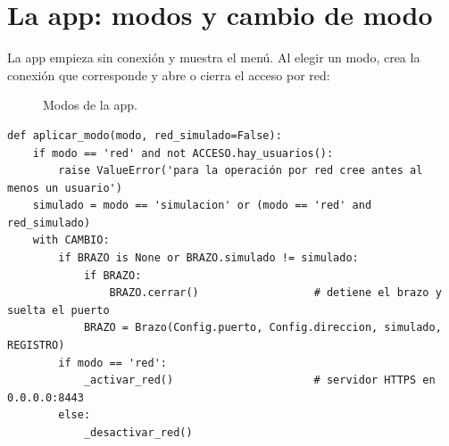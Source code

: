 \documentclass[a4paper,11pt]{article}
\begin{document}
\section{La app: modos y cambio de modo}
La app empieza sin conexión y muestra el menú. Al elegir un modo,  crea la conexión que corresponde y abre o cierra el acceso por red:

\begin{figure}[H]
\centering
{}
\caption{Modos de la app.}
\end{figure}

\begin{lstlisting}[style=py, caption={Cambio de modo (\texttt{gemelo\_brazo.py}).}]
def aplicar_modo(modo, red_simulado=False):
    if modo == 'red' and not ACCESO.hay_usuarios():
        raise ValueError('para la operación por red cree antes al menos un usuario')
    simulado = modo == 'simulacion' or (modo == 'red' and red_simulado)
    with CAMBIO:
        if BRAZO is None or BRAZO.simulado != simulado:
            if BRAZO:
                BRAZO.cerrar()                  # detiene el brazo y suelta el puerto
            BRAZO = Brazo(Config.puerto, Config.direccion, simulado, REGISTRO)
        if modo == 'red':
            _activar_red()                      # servidor HTTPS en 0.0.0.0:8443
        else:
            _desactivar_red()
\end{lstlisting}
\end{document}
